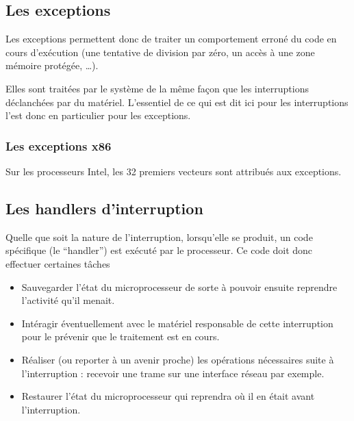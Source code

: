 \subsection{Les exceptions}

   Les exceptions permettent donc de traiter un comportement erroné du
code en cours d'exécution (une tentative de division par zéro, un
accès à une zone mémoire protégée, \ldots).

   Elles sont traitées par le système de la même façon que les
interruptions déclanchées par du matériel. L'essentiel de ce qui est
dit ici pour les interruptions l'est donc en particulier pour les
exceptions.

%
\subsubsection{Les exceptions x86}

   Sur les processeurs Intel, les 32 premiers vecteurs sont attribués
aux exceptions.

%
\subsection{Les handlers d'interruption}

   Quelle que soit la nature de l'interruption, lorsqu'elle se
produit, un code spécifique (le ``handler'') est exécuté par le
processeur. Ce code doit donc effectuer certaines tâches

\begin{itemize}
   \item Sauvegarder l'état du microprocesseur de sorte à pouvoir
     ensuite reprendre l'activité qu'il menait.
   \item Intéragir éventuellement avec le matériel responsable de
     cette interruption pour le prévenir que le traitement est en
     cours. 
   \item Réaliser (ou reporter à un avenir proche) les opérations
     nécessaires suite à l'interruption : recevoir une trame sur une
     interface réseau par exemple.
   \item Restaurer l'état du microprocesseur qui reprendra où il en
     était avant l'interruption.
\end{itemize}
%
